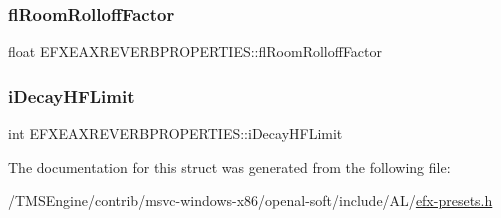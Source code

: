 \subsubsection{\texorpdfstring{fl\+Room\+Rolloff\+Factor}{flRoomRolloffFactor}}
{\footnotesize\ttfamily float E\+F\+X\+E\+A\+X\+R\+E\+V\+E\+R\+B\+P\+R\+O\+P\+E\+R\+T\+I\+E\+S\+::fl\+Room\+Rolloff\+Factor}

\mbox{\label{struct_e_f_x_e_a_x_r_e_v_e_r_b_p_r_o_p_e_r_t_i_e_s_a454d6bbeaeaf108414712439d36679ff}} 
\subsubsection{\texorpdfstring{i\+Decay\+H\+F\+Limit}{iDecayHFLimit}}
{\footnotesize\ttfamily int E\+F\+X\+E\+A\+X\+R\+E\+V\+E\+R\+B\+P\+R\+O\+P\+E\+R\+T\+I\+E\+S\+::i\+Decay\+H\+F\+Limit}



The documentation for this struct was generated from the following file\+:\begin{DoxyCompactItemize}
\item 
/\+T\+M\+S\+Engine/contrib/msvc-\/windows-\/x86/openal-\/soft/include/\+A\+L/\hyperlink{efx-presets_8h}{efx-\/presets.\+h}\end{DoxyCompactItemize}
